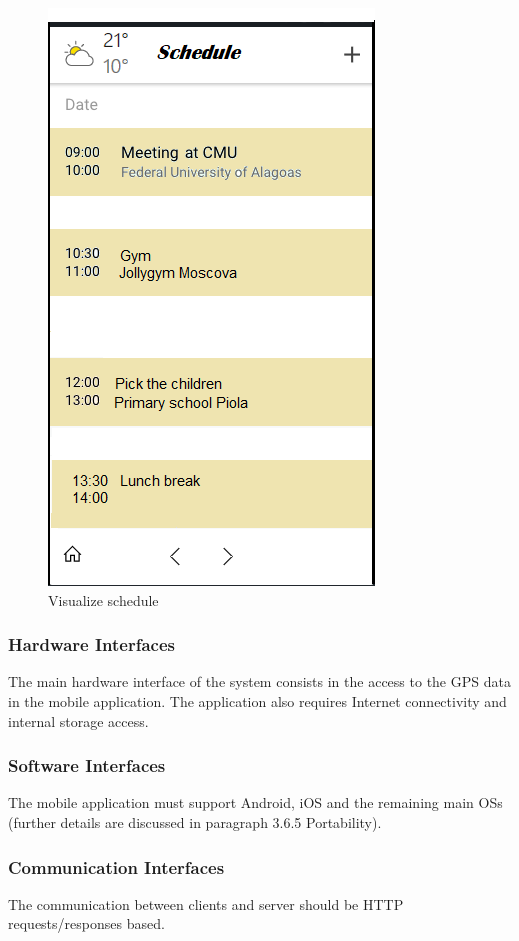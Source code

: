 		\begin{figure}[H]
			\centerline{\includegraphics[scale=0.5]{Images/schedule}}
			\caption{Visualize schedule}
		\end{figure}
	
	\subsubsection{Hardware Interfaces}
	The main hardware interface of the system consists in the access to the GPS data
	in the mobile application. The application also requires Internet connectivity
	and internal storage access.
	
	\subsubsection{Software Interfaces}
	The mobile application must support Android, iOS and the remaining main OSs (further details are discussed in paragraph 3.6.5 Portability).
	\subsubsection{Communication Interfaces}
	The communication between clients and server should be HTTP requests/responses based.
